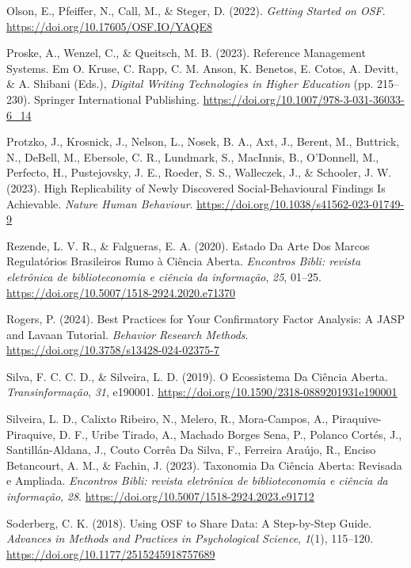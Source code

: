 \documentclass[
  a4paper,
]{article}
\newlength{\cslhangindent}
\newenvironment{CSLReferences}[2] %
 {\begin{list}{}{%
  \setlength{\itemindent}{0pt}
  \setlength{\leftmargin}{0pt}
  \setlength{\parsep}{0pt}
  \ifodd #1
   \setlength{\leftmargin}{\cslhangindent}
   \setlength{\itemindent}{-1\cslhangindent}
  \fi
  \setlength{\itemsep}{#2\baselineskip}}}
 {\end{list}}
\begin{document}
\begin{CSLReferences}{1}{0}
Olson, E., Pfeiffer, N., Call, M., \& Steger, D. (2022). \emph{Getting
Started on OSF}. \url{https://doi.org/10.17605/OSF.IO/YAQE8}

Proske, A., Wenzel, C., \& Queitsch, M. B. (2023). Reference Management
Systems. Em O. Kruse, C. Rapp, C. M. Anson, K. Benetos, E. Cotos, A.
Devitt, \& A. Shibani (Eds.), \emph{Digital Writing Technologies in
Higher Education} (pp. 215--230). Springer International Publishing.
\url{https://doi.org/10.1007/978-3-031-36033-6_14}

Protzko, J., Krosnick, J., Nelson, L., Nosek, B. A., Axt, J., Berent,
M., Buttrick, N., DeBell, M., Ebersole, C. R., Lundmark, S., MacInnis,
B., O'Donnell, M., Perfecto, H., Pustejovsky, J. E., Roeder, S. S.,
Walleczek, J., \& Schooler, J. W. (2023). High Replicability of Newly
Discovered Social-Behavioural Findings Is Achievable. \emph{Nature Human
Behaviour}. \url{https://doi.org/10.1038/s41562-023-01749-9}

Rezende, L. V. R., \& Falgueras, E. A. (2020). Estado Da Arte Dos Marcos
Regulat{ó}rios Brasileiros Rumo {à} {Ci{ê}ncia Aberta}. \emph{Encontros
Bibli: revista eletr{ô}nica de biblioteconomia e ci{ê}ncia da
informa{ç}{ã}o}, \emph{25}, 01--25.
\url{https://doi.org/10.5007/1518-2924.2020.e71370}

Rogers, P. (2024). Best Practices for Your Confirmatory Factor Analysis:
{A JASP} and Lavaan Tutorial. \emph{Behavior Research Methods}.
\url{https://doi.org/10.3758/s13428-024-02375-7}

Silva, F. C. C. D., \& Silveira, L. D. (2019). O Ecossistema Da
{Ci{ê}ncia Aberta}. \emph{Transinforma{ç}{ã}o}, \emph{31}, e190001.
\url{https://doi.org/10.1590/2318-0889201931e190001}

Silveira, L. D., Calixto Ribeiro, N., Melero, R., Mora-Campos, A.,
Piraquive-Piraquive, D. F., Uribe Tirado, A., Machado Borges Sena, P.,
Polanco Cortés, J., Santillán-Aldana, J., Couto Corrêa Da Silva, F.,
Ferreira Araújo, R., Enciso Betancourt, A. M., \& Fachin, J. (2023).
Taxonomia Da {Ci{ê}ncia Aberta}: Revisada e Ampliada. \emph{Encontros
Bibli: revista eletr{ô}nica de biblioteconomia e ci{ê}ncia da
informa{ç}{ã}o}, \emph{28}.
\url{https://doi.org/10.5007/1518-2924.2023.e91712}

Soderberg, C. K. (2018). Using OSF to Share Data: A Step-by-Step Guide.
\emph{Advances in Methods and Practices in Psychological Science},
\emph{1}(1), 115--120. \url{https://doi.org/10.1177/2515245918757689}


\end{CSLReferences}
\end{document}
